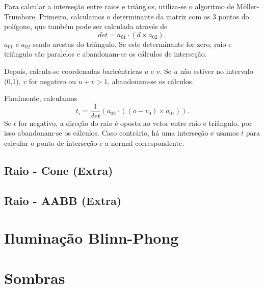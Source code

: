 \documentclass{article}
\begin{document}
        \par
        Para calcular a interseção entre raios e triânglos, utiliza-se o algoritmo de Möller-Trumbore. Primeiro, calculamos o determinante da matriz com os 3 pontos do polígono, que também pode ser calculada através de 
        $$
            det = a_{01} \cdot (d \times a_{02} ),
        $$
        $a_{01}$ e $a_{02}$ sendo arestas do triângulo. Se este determinante for zero, raio e triângulo são paralelos e abandonam-se os cálculos de interseção.
        \par
        Depois, calcula-se coordenadas baricêntricas $u$ e $v$. Se $u$ não estiver no intervalo (0,1), $v$ for negativo ou $u + v > 1$, abandonam-se os cálculos.
        \par
        Finalmente, calculamos
        $$
            t_i = \frac{1}{det} (a_{02} \cdot ((o -v_0) \times a_{01})).
        $$
        Se $t$ for negativo, a direção do raio é oposta ao vetor entre raio e triângulo, por isso abandonam-se os cálculos. Caso contrário, há uma interseção e usamos $t$ para calcular o ponto de interseção e a normal correspondente.

    \subsection*{Raio - Cone (Extra)}
    \subsection*{Raio - AABB (Extra)}
    \section*{Iluminação Blinn-Phong}
    \section*{Sombras}
\end{document}
